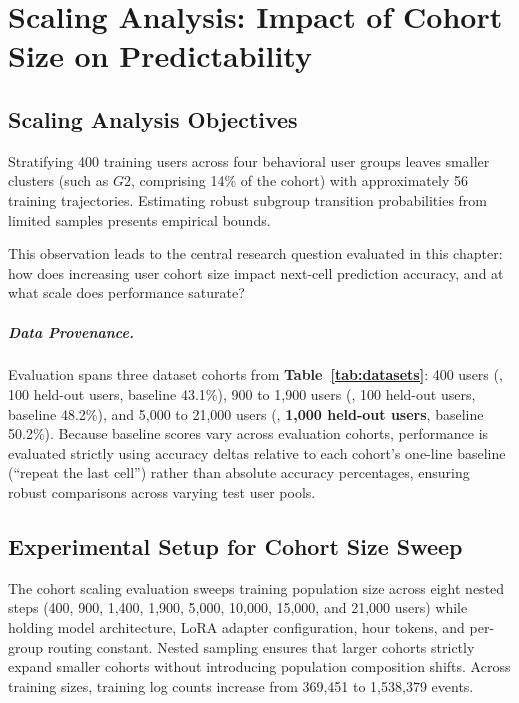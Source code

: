 \chapter{Scaling Analysis: Impact of Cohort Size on Predictability}
\label{ch:scale}

\section{Scaling Analysis Objectives}

Stratifying 400 training users across four behavioral user groups leaves smaller clusters (such as $G2$, comprising 14\% of the cohort) with approximately 56 training trajectories. Estimating robust subgroup transition probabilities from limited samples presents empirical bounds.

This observation leads to the central research question evaluated in this chapter: how does increasing user cohort size impact next-cell prediction accuracy, and at what scale does performance saturate?

\paragraph{Data Provenance.} Evaluation spans three dataset cohorts from \textbf{Table~\ref{tab:datasets}}: 400 users (\Dmob{}, 100 held-out users, baseline 43.1\%), 900 to 1,900 users (\Dtwok{}, 100 held-out users, baseline 48.2\%), and 5,000 to 21,000 users (\Deleven{}, \textbf{1,000 held-out users}, baseline 50.2\%). Because baseline scores vary across evaluation cohorts, performance is evaluated strictly using accuracy deltas relative to each cohort's one-line baseline (``repeat the last cell'') rather than absolute accuracy percentages, ensuring robust comparisons across varying test user pools.

\section{Experimental Setup for Cohort Size Sweep}

The cohort scaling evaluation sweeps training population size across eight nested steps (400, 900, 1,400, 1,900, 5,000, 10,000, 15,000, and 21,000 users) while holding model architecture, LoRA adapter configuration, hour tokens, and per-group routing constant. Nested sampling ensures that larger cohorts strictly expand smaller cohorts without introducing population composition shifts. Across training sizes, training log counts increase from 369,451 to 1,538,379 events.


